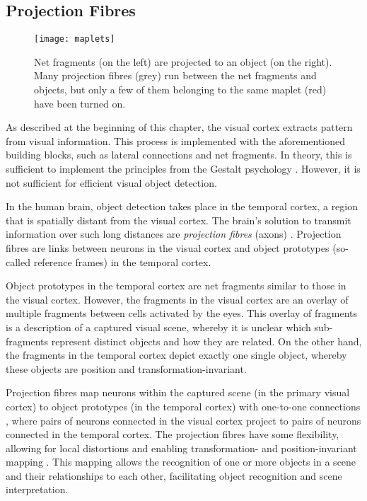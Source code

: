 \subsection{Projection Fibres}
\begin{figure}[h]
    \centering
    \texttt{[image: maplets]}
    \caption[An active maplet mapping net fragments to object prototypes]{Net fragments (on the left) are projected to an object (on the right). Many projection fibres (grey) run between the net fragments and objects, but only a few of them belonging to the same maplet (red) have been turned on.}
\end{figure}
%
As described at the beginning of this chapter, the visual cortex extracts pattern from visual information. This process is implemented with the aforementioned building blocks, such as lateral connections and net fragments. In theory, this is sufficient to implement the principles from the Gestalt psychology . However, it is not sufficient for efficient visual object detection.

In the human brain, object detection takes place in the temporal cortex, a region that is spatially distant from the visual cortex.
The brain's solution to transmit information over such long distances are \emph{projection fibres} (axons) .
Projection fibres are links between neurons in the visual cortex and object prototypes (so-called reference frames) in the temporal cortex.

Object prototypes in the temporal cortex are net fragments similar to those in the visual cortex. However, the fragments in the visual cortex are an overlay of multiple fragments between cells activated by the eyes.
This overlay of fragments is a description of a captured visual scene, whereby it is unclear which sub-fragments represent distinct objects and how they are related.
On the other hand, the fragments in the temporal cortex depict exactly one single object, whereby these objects are position and transformation-invariant.

Projection fibres map neurons within the captured scene (in the primary visual cortex) to object prototypes (in the temporal cortex) with one-to-one connections , where pairs of neurons connected in the visual cortex project to pairs of neurons connected in the temporal cortex. The projection fibres have some flexibility, allowing for local distortions and enabling transformation- and position-invariant mapping . This mapping allows the recognition of one or more objects in a scene and their relationships to each other, facilitating object recognition and scene interpretation.

